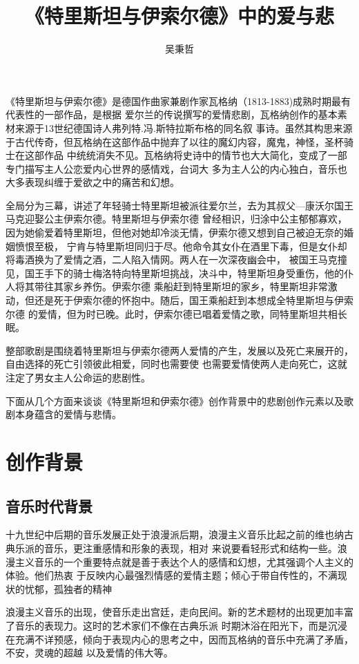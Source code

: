 \documentclass[10pt,a4paper]{ctexart}
\author{吴秉哲}
\title{《特里斯坦与伊索尔德》中的爱与悲}
\newcommand{\upcite}[1]{\textsuperscript{\textsuperscript{\cite{#1}}}}
\begin{document}
	\maketitle
	《特里斯坦与伊索尔德》是德国作曲家兼剧作家瓦格纳（1813-1883)成熟时期最有代表性的一部作品，是根据
	爱尔兰的传说撰写的爱情悲剧，瓦格纳创作的基本素材来源于13世纪德国诗人弗列特.冯.斯特拉斯布格的同名叙
	事诗\upcite{百度百科}。虽然其构思来源于古代传奇，但瓦格纳在这部作品中抛弃了以往的魔幻内容，魔鬼，神怪，圣杯骑士在这部作品
	中统统消失不见。瓦格纳将史诗中的情节也大大简化，变成了一部专门描写主人公恋爱内心世界的感情戏，台词大
	多为主人公的内心独白，音乐也大多表现纠缠于爱欲之中的痛苦和幻想。
	
	全局分为三幕，讲述了年轻骑士特里斯坦被派往爱尔兰，去为其叔父—康沃尔国王马克迎娶公主伊索尔德。特里斯坦与伊索尔德
	曾经相识，归涂中公主郁郁寡欢，因为她偷爱着特里斯坦，但他对她却冷淡无情，伊索尔德又想到自己被迫无奈的婚姻愤恨至极，
	宁肯与特里斯坦同归于尽。他命令其女仆在酒里下毒，但是女仆却将毒酒换为了爱情之酒，二人陷入情网。两人在一次深夜幽会中，
	被国王马克撞见，国王手下的骑士梅洛特向特里斯坦挑战，决斗中，特里斯坦身受重伤，他的仆人将其带往其家乡养伤。伊索尔德
	乘船赶到特里斯坦的家乡，特里斯坦非常激动，但还是死于伊索尔德的怀抱中。随后，国王乘船赶到本想成全特里斯坦与伊索尔德
	的爱情，但为时已晚。此时，伊索尔德已唱着爱情之歌，同特里斯坦共相长眠\upcite{麦耶尔}。
	
	整部歌剧是围绕着特里斯坦与伊索尔德两人爱情的产生，发展以及死亡来展开的，自由选择的死亡引领彼此相爱，同时也需要使
 	也需要爱情使两人走向死亡，这就注定了男女主人公命运的悲剧性。
 	
 	下面从几个方面来谈谈《特里斯坦和伊索尔德》创作背景中的悲剧创作元素以及歌剧本身蕴含的爱情与悲情。
 	\section*{创作背景}
 	\subsection*{音乐时代背景}
 	十九世纪中后期的音乐发展正处于浪漫派后期，浪漫主义音乐比起之前的维也纳古典乐派的音乐，更注重感情和形象的表现，相对
 	来说要看轻形式和结构一些。浪漫主义音乐的一个重要特点就是善于表达个人的感情和幻想，尤其强调个人主义的体验。他们热衷
 	于反映内心最强烈情感的爱情主题；倾心于带自传性的，不满现状的忧郁，孤独者的精神\upcite{余志刚}
 	
 	浪漫主义音乐的出现，使音乐走出宫廷，走向民间。新的艺术题材的出现更加丰富了音乐的表现力。这时的艺术家们不像在古典乐派
 	时期沐浴在阳光下，而是沉浸在充满不详预感，倾向于表现内心的思考之中，因而瓦格纳的音乐中充满了矛盾，不安，灵魂的超越
 	以及爱情的伟大等。
\end{document}
